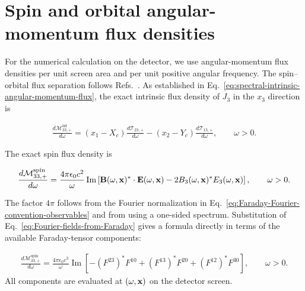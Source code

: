 \section{Spin and orbital angular-momentum flux densities}

For the numerical calculation on the detector, we use angular-momentum flux
densities per unit screen area and per unit positive angular frequency.  The
spin--orbital flux separation follows
Refs.~\cite{barnett_optical_2002,bliokh_conservation_2014}.  As established in
Eq.~\eqref{eq:spectral-intrinsic-angular-momentum-flux}, the exact intrinsic
flux density of $J_3$ in the $x_3$ direction is
\begin{importantbox}
  \begin{align}
    \frac{d\mathcal M^{\mathrm{int}}_{33,+}}{d\omega}
    =(x_1-X_c)\frac{d\mathcal T_{23,+}}{d\omega}
    -(x_2-Y_c)\frac{d\mathcal T_{13,+}}{d\omega},
    \qquad \omega>0.
    \label{eq:one-sided-intrinsic-angular-momentum-flux-density}
  \end{align}
\end{importantbox}

The exact spin flux density is
\begin{importantbox}
\begin{align}
  \frac{d\mathcal M^{\mathrm{spin}}_{33,+}}{d\omega}
  =\frac{4\pi\epsilon_0c^2}{\omega}\operatorname{Im}
  \left[
    {\bf B}(\omega,{\bf x})^*\cdot{\bf E}(\omega,{\bf x})
    -2B_3(\omega,{\bf x})^*E_3(\omega,{\bf x})
  \right],
  \qquad \omega>0.
  \label{eq:one-sided-spin-angular-momentum-flux-density}
\end{align}
\end{importantbox}
The factor $4\pi$ follows from the Fourier normalization in
Eq.~\eqref{eq:Faraday-Fourier-convention-observables} and from using a
one-sided spectrum.  Substitution of
Eq.~\eqref{eq:Fourier-fields-from-Faraday} gives a formula directly in terms
of the available Faraday-tensor components:
\begin{highlightbox}[title={Spin angular-momentum flux density from the Faraday tensor}]
  \begin{align}
    \frac{d\mathcal M^{\mathrm{spin}}_{33,+}}{d\omega}
    =\frac{4\pi\epsilon_0c^3}{\omega}\operatorname{Im}\left[
      -(F^{23})^*F^{10}+(F^{13})^*F^{20}+(F^{12})^*F^{30}
    \right],
    \qquad \omega>0.
    \label{eq:one-sided-spin-angular-momentum-flux-density-Faraday}
  \end{align}
  All components are evaluated at $(\omega,{\bf x})$ on the detector screen.
\end{highlightbox}

